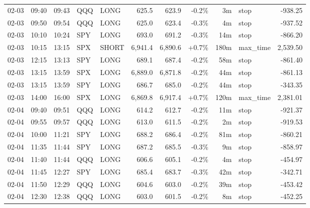 \documentclass[11pt,a4paper,twoside]{article}
\begin{document}
\begin{center}
\begin{longtable}{>{\color{txtmain}}l l l l l r r r r >{\color{txtmain}}l r}
02-03 & 09:40 & 09:43 & QQQ & LONG & 625.5 & 623.9 & \textcolor{lossred}{-0.2\%} & 3m & stop & \textcolor{lossred}{-938.25} \\
02-03 & 09:50 & 09:54 & QQQ & LONG & 625.0 & 623.4 & \textcolor{lossred}{-0.3\%} & 4m & stop & \textcolor{lossred}{-937.52} \\
02-03 & 10:10 & 10:24 & SPY & LONG & 693.0 & 691.2 & \textcolor{lossred}{-0.3\%} & 14m & stop & \textcolor{lossred}{-866.20} \\
02-03 & 10:15 & 13:15 & SPX & SHORT & 6,941.4 & 6,890.6 & \textcolor{wingreen}{+0.7\%} & 180m & max\_time & \textcolor{wingreen}{2,539.50} \\
02-03 & 12:15 & 13:13 & SPY & LONG & 689.1 & 687.4 & \textcolor{lossred}{-0.2\%} & 58m & stop & \textcolor{lossred}{-861.40} \\
02-03 & 13:15 & 13:59 & SPX & LONG & 6,889.0 & 6,871.8 & \textcolor{lossred}{-0.2\%} & 44m & stop & \textcolor{lossred}{-861.13} \\
02-03 & 13:15 & 13:59 & SPY & LONG & 686.7 & 685.0 & \textcolor{lossred}{-0.2\%} & 44m & stop & \textcolor{lossred}{-343.35} \\
02-03 & 14:00 & 16:00 & SPX & LONG & 6,869.8 & 6,917.4 & \textcolor{wingreen}{+0.7\%} & 120m & max\_time & \textcolor{wingreen}{2,381.01} \\
02-04 & 09:40 & 09:51 & QQQ & LONG & 614.2 & 612.7 & \textcolor{lossred}{-0.2\%} & 11m & stop & \textcolor{lossred}{-921.37} \\
02-04 & 09:55 & 09:57 & QQQ & LONG & 613.0 & 611.5 & \textcolor{lossred}{-0.2\%} & 2m & stop & \textcolor{lossred}{-919.53} \\
02-04 & 10:00 & 11:21 & SPY & LONG & 688.2 & 686.4 & \textcolor{lossred}{-0.2\%} & 81m & stop & \textcolor{lossred}{-860.21} \\
02-04 & 11:35 & 11:44 & SPY & LONG & 687.2 & 685.5 & \textcolor{lossred}{-0.3\%} & 9m & stop & \textcolor{lossred}{-858.97} \\
02-04 & 11:40 & 11:44 & QQQ & LONG & 606.6 & 605.1 & \textcolor{lossred}{-0.2\%} & 4m & stop & \textcolor{lossred}{-454.97} \\
02-04 & 11:45 & 12:27 & SPY & LONG & 685.4 & 683.7 & \textcolor{lossred}{-0.3\%} & 42m & stop & \textcolor{lossred}{-342.71} \\
02-04 & 11:50 & 12:29 & QQQ & LONG & 604.6 & 603.0 & \textcolor{lossred}{-0.2\%} & 39m & stop & \textcolor{lossred}{-453.42} \\
02-04 & 12:30 & 12:38 & QQQ & LONG & 603.0 & 601.5 & \textcolor{lossred}{-0.2\%} & 8m & stop & \textcolor{lossred}{-452.25} \\

\end{longtable}
\end{center}
\end{document}
